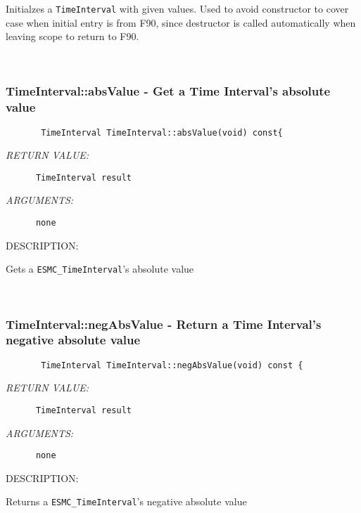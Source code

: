         Initialzes a {\tt TimeInterval} with given values.  Used to avoid
        constructor to cover case when initial entry is from F90, since
        destructor is called automatically when leaving scope to return to F90.
   
 
\mbox{}\hrulefill\ 
 
\subsubsection [TimeInterval::absValue] {TimeInterval::absValue - Get a Time Interval's absolute value}


  
\begin{verbatim}       TimeInterval TimeInterval::absValue(void) const{\end{verbatim}{\em RETURN VALUE:}
\begin{verbatim}      TimeInterval result\end{verbatim}{\em ARGUMENTS:}
\begin{verbatim}      none\end{verbatim}
{\sf DESCRIPTION:\\ }


        Gets a {\tt ESMC\_TimeInterval}'s absolute value
   
 
\mbox{}\hrulefill\ 
 
\subsubsection [TimeInterval::negAbsValue] {TimeInterval::negAbsValue - Return a Time Interval's negative absolute value}


  
\begin{verbatim}       TimeInterval TimeInterval::negAbsValue(void) const {\end{verbatim}{\em RETURN VALUE:}
\begin{verbatim}      TimeInterval result\end{verbatim}{\em ARGUMENTS:}
\begin{verbatim}      none\end{verbatim}
{\sf DESCRIPTION:\\ }


        Returns a {\tt ESMC\_TimeInterval}'s negative absolute value
   
